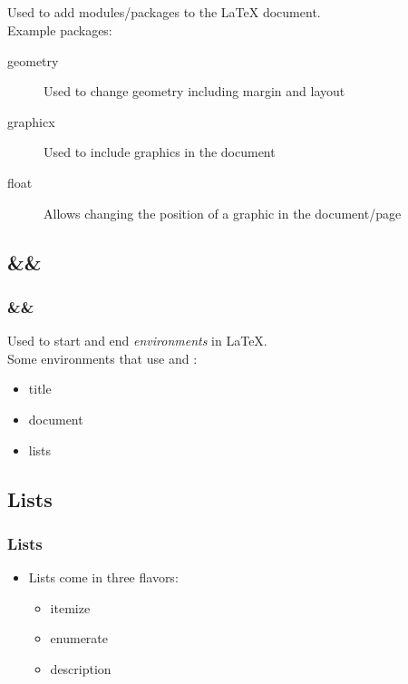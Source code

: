 \subsection{}

\begin{frame}
\frametitle{}
    Used to add modules/packages to the \LaTeX{} document.\\
    Example packages:
    \begin{description}
        \item[geometry] Used to change geometry including margin and layout
        \item[graphicx] Used to include graphics in the document
        \item[float] Allows changing the position of a graphic in the document/page
    \end{description}
\end{frame}



\subsection{ \&\& }

\begin{frame}
\frametitle{ \&\& }
    Used to start and end \textit{environments} in \LaTeX .\\
    Some environments that use  and 
    :
    \begin{itemize}
        \item title
        \item document
        \item lists
    \end{itemize}
\end{frame}



\subsection{Lists}

\begin{frame}
\frametitle{Lists}
    \begin{itemize}
        \item Lists come in three flavors:
        \begin{itemize}
            \item itemize
            \item enumerate
            \item description
        \end{itemize}
    \end{itemize}
\end{frame}




